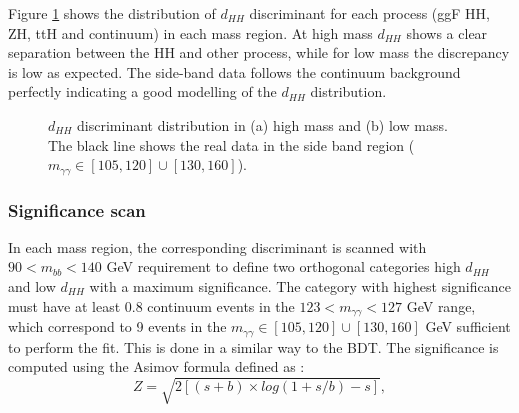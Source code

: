 Figure \ref{fig:HHyybb:ObjEvt:DNN:dHH} shows the distribution of $d_{HH}$ discriminant for each process (ggF HH, ZH, ttH and continuum) in each mass region. At high mass $d_{HH}$ shows a clear separation between the HH and other process, while for low mass the discrepancy is low as expected. The side-band data follows the continuum background perfectly indicating a good modelling of the $d_{HH}$ distribution. 
\begin{figure}[htbp]
    \centering
    \caption{$d_{HH}$ discriminant distribution in (a) high mass and (b) low mass. The black line shows the real data in the side band region ($m_{\gamma\gamma}\in[105,120] \cup [130,160]$).}
    \label{fig:HHyybb:ObjEvt:DNN:dHH}
\end{figure}

\subsubsection{Significance scan}
In each mass region, the corresponding discriminant is scanned with $90<m_{bb}<140$ GeV requirement to define two orthogonal categories high $d_{HH}$ and low $d_{HH}$ with a maximum significance. The category with highest significance must have at least 0.8 continuum events in the $123<m_{\gamma\gamma}<127$ GeV range, which correspond to 9 events in the $m_{\gamma\gamma}\in[105,120] \cup [130,160]$ GeV sufficient to perform the \myy fit. This is done in a similar way to the BDT. The significance is computed using the Asimov formula \cite{Z} defined as : 
\begin{equation}
    Z = \sqrt{2\left[(s+b)\times log(1+s/b)-s\right]},
\end{equation}

